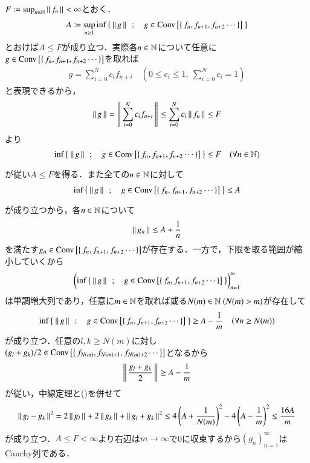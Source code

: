 \begin{prf}
	$F \coloneqq \operatorname*{sup}_{n \in \mathbb{N}} \left\|\, f_n\, \right\|_{} < \infty$とおく．
	\begin{align}
		A \coloneqq \operatorname*{sup}_{n \geq 1} \operatorname*{inf}_{} \left\{\ \left\|\, g\, \right\|_{}\ \, ; \quad g \in \mathrm{Conv}\left[\left\{\, f_n,f_{n+1},f_{n+2} \cdots \, \right\}\right]\ \right\}
	\end{align}
	とおけば$A \leq F$が成り立つ．実際各$n \in \mathbb{N}$について任意に$g \in \mathrm{Conv}\left[\left\{\, f_n,f_{n+1},f_{n+2} \cdots \, \right\}\right]$を取れば
	\begin{align}
		g = \sum_{i=0}^{N}c_i f_{n+i} \quad \left( 0 \leq c_i \leq 1,\ \mbox{$\sum_{i=0}^{N} c_i = 1$} \right)
	\end{align}
	と表現できるから，
	\begin{align}
		\left\|\, g\, \right\|_{} = \left\|\, \sum_{i=0}^{N}c_i f_{n+i}\, \right\|_{} \leq \sum_{i=0}^{N}c_i \left\|\, f_n\, \right\|_{} \leq F
	\end{align}
	より
	\begin{align}
		\operatorname*{inf}_{} \left\{\ \left\|\, g\, \right\|_{}\ \, ; \quad g \in \mathrm{Conv}\left[\left\{\, f_n,f_{n+1},f_{n+2} \cdots \, \right\}\right]\ \right\} \leq F \quad (\forall n \in \mathbb{N})
	\end{align}
	が従い$A \leq F$を得る．また全ての$n \in \mathbb{N}$に対して
	\begin{align}
		\operatorname*{inf}_{} \left\{\ \left\|\, g\, \right\|_{}\ \, ; \quad g \in \mathrm{Conv}\left[\left\{\, f_n,f_{n+1},f_{n+2} \cdots \, \right\}\right]\ \right\} \leq A
	\end{align}
	が成り立つから，各$n \in \mathbb{N}$について
	\begin{align}
		\left\|\, g_n\, \right\|_{} \leq A + \frac{1}{n} \label{eq:thm_kolmos_1}
	\end{align}
	を満たす$g_n \in \mathrm{Conv}\left[\left\{\, f_n,f_{n+1},f_{n+2} \cdots \, \right\}\right]$が存在する．一方で，下限を取る範囲が縮小していくから
	\begin{align}
		\left( \operatorname*{inf}_{} \left\{\ \left\|\, g\, \right\|_{}\ \, ; \quad g \in \mathrm{Conv}\left[\left\{\, f_n,f_{n+1},f_{n+2} \cdots \, \right\}\right]\ \right\} \right)_{n=1}^\infty
	\end{align}
	は単調増大列であり，任意に$m \in \mathbb{N}$を取れば或る$N(m) \in \mathbb{N}\ (N(m) > m)$が存在して
	\begin{align}
		\operatorname*{inf}_{} \left\{\ \left\|\, g\, \right\|_{}\ \, ; \quad g \in \mathrm{Conv}\left[\left\{\, f_n,f_{n+1},f_{n+2} \cdots \, \right\}\right]\ \right\} \geq A - \frac{1}{m}
		\quad (\forall n \geq N(m))
	\end{align}
	が成り立つ．任意の$l,k \geq N(m)$に対し$(g_l + g_k) / 2 \in \mathrm{Conv}\left[\left\{\, f_{N(m)},f_{N(m)+1},f_{N(m)+2} \cdots \, \right\}\right]$となるから
	\begin{align}
		\left\|\, \frac{g_l + g_k}{2}\, \right\|_{} \geq A - \frac{1}{m}
	\end{align}
	が従い，中線定理と()を併せて
	\begin{align}
		\left\|\, g_l - g_k\, \right\|_{}^2 = 2\left\|\, g_l\, \right\|_{} + 2\left\|\, g_k\, \right\|_{} + \left\|\, g_l + g_k\, \right\|_{}^2 \leq 4\left( A + \frac{1}{N(m)} \right)^2 - 4\left( A - \frac{1}{m} \right)^2 \leq \frac{16A}{m}
	\end{align}
	が成り立つ．$A \leq F < \infty$より右辺は$m \longrightarrow \infty$で0に収束するから$(g_n)_{n=1}^{\infty}$はCauchy列である．
	\QED
\end{prf}